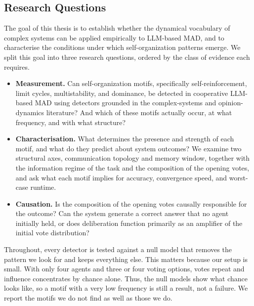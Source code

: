 \subsection{Research Questions}
\label{sec:intro:rqs}

The goal of this thesis is to establish whether the dynamical
vocabulary of complex systems can be applied empirically to \ac{LLM}-based
\ac{MAD}, and to characterise the conditions under which
self-organization patterns emerge. We split this goal into three research
questions, ordered by the class of evidence each requires.

\begin{itemize}
  \item[\textbf{RQ1}] \textbf{Measurement.} Can self-organization motifs,
        specifically self-reinforcement, limit cycles, multistability, and
        dominance, be detected in cooperative \ac{LLM}-based \ac{MAD} using
        detectors grounded in the complex-systems and opinion-dynamics literature? 
        And which of these motifs actually occur, at what frequency, and with what structure?

  \item[\textbf{RQ2}] \textbf{Characterisation.} What determines the presence and
        strength of each motif, and what do they predict about system outcomes?
        We examine two structural axes, communication topology and
        memory window, together with the information regime of the task and the
        composition of the opening votes, and ask what each motif implies for
        accuracy, convergence speed, and worst-case runtime.

  \item[\textbf{RQ3}] \textbf{Causation.} Is the composition of the opening votes
        causally responsible for the outcome? Can the system generate a correct
        answer that no agent initially held, or does deliberation function
        primarily as an amplifier of the initial vote distribution?
\end{itemize}

Throughout, every detector is tested against a null
model that removes the pattern we look for and keeps everything else. This
matters because our setup is small. With only four agents and three or four voting options,
votes repeat and influence concentrates by chance alone. Thus, the null models show
what chance looks like, so a motif with a very low frequency is still a result,
not a failure. We report the motifs we do not find as well as those we do.

